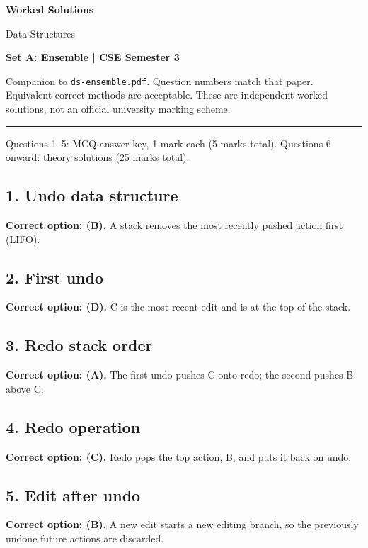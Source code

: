 \documentclass[11pt,a4paper]{article}
\begin{document}
{\LARGE\bfseries Worked Solutions}\par{\large Data Structures}\par\textbf{Set A: Ensemble | CSE Semester 3}\par
Companion to \texttt{ds-ensemble.pdf}. Question numbers match that paper. Equivalent correct methods are acceptable. These are independent worked solutions, not an official university marking scheme.\par\medskip\hrule\medskip
Questions 1--5: MCQ answer key, 1 mark each (5 marks total). Questions 6 onward: theory solutions (25 marks total).\par
\noindent\begin{minipage}{\linewidth}\subsection*{1. Undo data structure}
\textbf{Correct option: (B).} A stack removes the most recently pushed action first (LIFO).
\end{minipage}\par\medskip
\noindent\begin{minipage}{\linewidth}\subsection*{2. First undo}
\textbf{Correct option: (D).} C is the most recent edit and is at the top of the stack.
\end{minipage}\par\medskip
\noindent\begin{minipage}{\linewidth}\subsection*{3. Redo stack order}
\textbf{Correct option: (A).} The first undo pushes C onto redo; the second pushes B above C.
\end{minipage}\par\medskip
\noindent\begin{minipage}{\linewidth}\subsection*{4. Redo operation}
\textbf{Correct option: (C).} Redo pops the top action, B, and puts it back on undo.
\end{minipage}\par\medskip
\noindent\begin{minipage}{\linewidth}\subsection*{5. Edit after undo}
\textbf{Correct option: (B).} A new edit starts a new editing branch, so the previously undone future actions are discarded.
\end{minipage}\par\medskip
\end{document}
